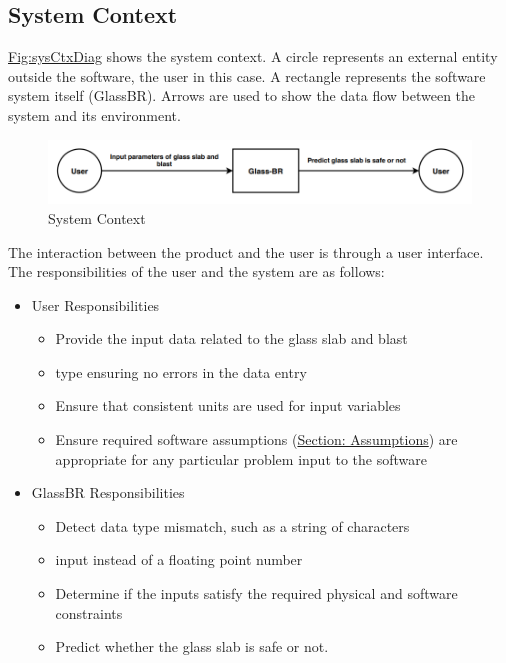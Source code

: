 \documentclass[12pt]{article}
\begin{document}
\subsection{System Context}
\label{Sec:SysContext}
\hyperref[Figure:sysCtxDiag]{Fig:sysCtxDiag} shows the system context. A circle represents an external entity outside the software, the user in this case. A rectangle represents the software system itself (GlassBR). Arrows are used to show the data flow between the system and its environment.
\begin{figure}
\begin{center}
\includegraphics[width=\textwidth]{../../../datafiles/GlassBR/SystemContextFigure.png}
\caption{System Context}
\label{Figure:sysCtxDiag}
\end{center}
\end{figure}
The interaction between the product and the user is through a user interface. The responsibilities of the user and the system are as follows:
\begin{itemize}
\item{User Responsibilities}
\begin{itemize}
\item{Provide the input data related to the glass slab and blast}
\item{type ensuring no errors in the data entry}
\item{Ensure that consistent units are used for input variables}
\item{Ensure required software assumptions (\hyperref[Sec:Assumps]{Section: Assumptions}) are appropriate for any particular problem input to the software}
\end{itemize}
\item{GlassBR Responsibilities}
\begin{itemize}
\item{Detect data type mismatch, such as a string of characters}
\item{input instead of a floating point number}
\item{Determine if the inputs satisfy the required physical and software constraints}
\item{Predict whether the glass slab is safe or not.}
\end{itemize}
\end{itemize}
\end{document}
